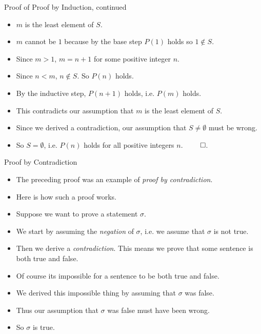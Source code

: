 \documentclass[handout]{beamer}
\begin{document}
\begin{frame}{Proof of  Proof by Induction, continued}
\begin{itemize}
  \item $m$ is the least element of $S$.
  \item $m$ cannot be $1$ because by the base step $P(1)$ holds so $1\notin S$.
  \item Since $m>1$, $m=n+1$ for some positive integer $n$.
  \item Since $n<m$, $n\notin S$. So $P(n)$ holds.
  \item By the inductive step, $P(n+1)$ holds, i.e. $P(m)$ holds.
  \item This contradicts our assumption that $m$ is the least element of $S$.
  \item Since we derived a contradiction, our assumption that $S\not=\emptyset$ must be wrong.
  \item So $S=\emptyset$, i.e. $P(n)$ holds for all positive integers $n$. $\qed$.
\end{itemize}
\end{frame}

\begin{frame}{Proof by Contradiction}
\begin{itemize}
\item The preceding proof was an example of \emph{proof by contradiction}.
\item Here is how such a proof works.
\item Suppose we want to prove a statement $\sigma$.
\item We start by assuming the \emph{negation} of $\sigma$, i.e. we assume
that $\sigma$ is not true.
\item Then we derive a \emph{contradiction}. This means we prove that some
sentence is both true and false.
\item Of course its impossible for a sentence to be both true and false.
\item We derived this impossible thing by assuming that $\sigma$ was false.
\item Thus our assumption that $\sigma$ was false must have been wrong.
\item So $\sigma$ is true.
\end{itemize}
\end{frame}
\end{document}
